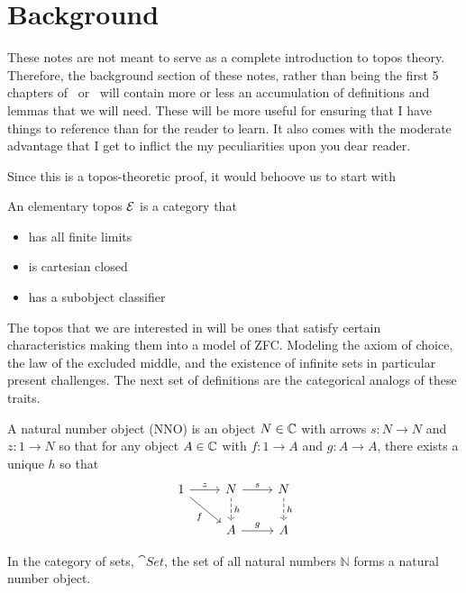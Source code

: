 \section{Background}\label{sec:background}

These notes are not meant to serve as a complete introduction to topos
theory. Therefore, the background section of these notes, rather than
being the first 5 chapters of~\citet{MacLane:92}
or~\citet{Johnstone:14} will contain more or less an accumulation of
definitions and lemmas that we will need. These will be more useful
for ensuring that I have things to reference than for the reader to
learn. It also comes with the moderate advantage that I get to inflict
the my peculiarities upon you dear reader.

Since this is a topos-theoretic proof, it would behoove us to start
with
\begin{defn}\label{defn:background:topos}
  An elementary topos $\mathcal{E}{}$ is a category that
  \begin{itemize}
  \item has all finite limits
  \item is cartesian closed
  \item has a subobject classifier
  \end{itemize}
\end{defn}
The topos that we are interested in will be ones that satisfy certain
characteristics making them into a model of ZFC. Modeling the axiom of
choice, the law of the excluded middle, and the existence of infinite
sets in particular present challenges. The next set of definitions are
the categorical analogs of these traits.
\begin{defn}\label{defn:background:nno}
  A natural number object (NNO) is an object $N \in \mathbb{C}$ with arrows
  $s : N \to N$ and $z : 1 \to N$ so that for any object $A \in \mathbb{C}$
  with $f : 1 \to A$ and $g : A \to A$, there exists a unique $h$ so
  that
  \[
    \begin{tikzcd}
      1 \ar[r, "z"] \ar[dr, swap, "f"] & N \ar[d, dashed, "h"] \ar[r, "s"]& N \ar[d, dashed, "h"]\\
      & A \ar[r, "g"]& A
    \end{tikzcd}
  \]
\end{defn}

\begin{example}
  In the category of sets, $\cat{Set}$, the set of all natural numbers
  $\mathbb{N}$ forms a natural number object.
\end{example}

